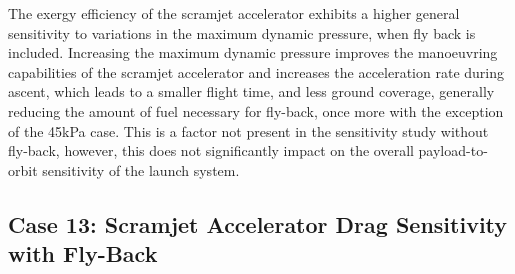 The exergy efficiency of the scramjet accelerator exhibits a higher general sensitivity to variations in the maximum dynamic pressure, when fly back is included.
Increasing the maximum dynamic pressure improves the manoeuvring capabilities of the scramjet accelerator and increases the acceleration rate during ascent, which leads to a smaller flight time, and less ground coverage, generally reducing the amount of fuel necessary for fly-back, once more with the exception of the 45kPa case. This is a factor not present in the sensitivity study without fly-back, however, this does not significantly impact on the overall payload-to-orbit sensitivity of the launch system. 




\subsection{Case 13: Scramjet Accelerator Drag Sensitivity with Fly-Back}\label{sec:dragvar}


